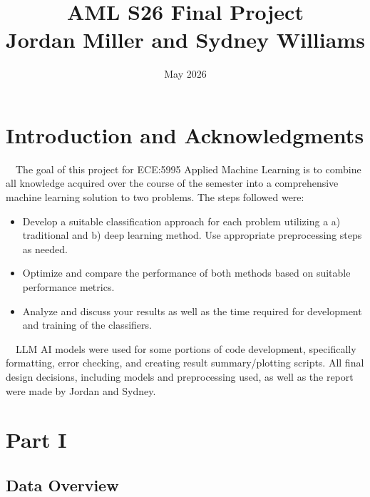 \documentclass[12pt]{article}
\title{
    \vspace{2cm}
    {\Large AML S26 Final Project} \\[0.5em]
    {\large Jordan Miller and Sydney Williams}
}
\author{}
\date{May 2026}
\begin{document}

\maketitle
\thispagestyle{empty}
\newpage

\tableofcontents
\newpage

\setcounter{section}{-1}
\section{Introduction and Acknowledgments}

\ \  The goal of this project for ECE:5995 Applied Machine Learning is to combine all knowledge acquired over the course of the semester into a comprehensive machine learning solution to two problems. The steps followed were: 
\begin{itemize}
\item{Develop a suitable classification approach for each problem utilizing a a) traditional and b) deep learning method. Use appropriate preprocessing steps as
needed.} 
\item{Optimize and compare the performance of both methods based on suitable performance metrics.}
\item{Analyze and discuss your results as well as the time required for development and training of the classifiers.}
\end{itemize}

\ \ LLM AI models were used for some portions of code development, specifically formatting, error checking, and creating result summary/plotting scripts. All final design decisions, including models and preprocessing used, as well as the report were made by Jordan and Sydney.
\section{Part I}

\subsection{Data Overview}
\end{document}
